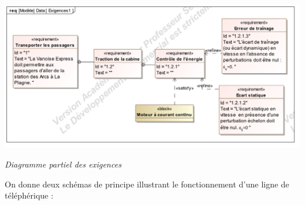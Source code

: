 \documentclass[10pt]{article}
\begin{document}
\begin{minipage}[c]{.6\linewidth}
\begin{center}
\includegraphics[width=\textwidth]{images/Exigences}

\textit{Diagramme partiel des exigences}
\end{center}
\end{minipage}

\vspace{.25cm}

On donne deux schémas de principe illustrant le fonctionnement d'une ligne de téléphérique :

\vspace{.25cm}
\end{document}
